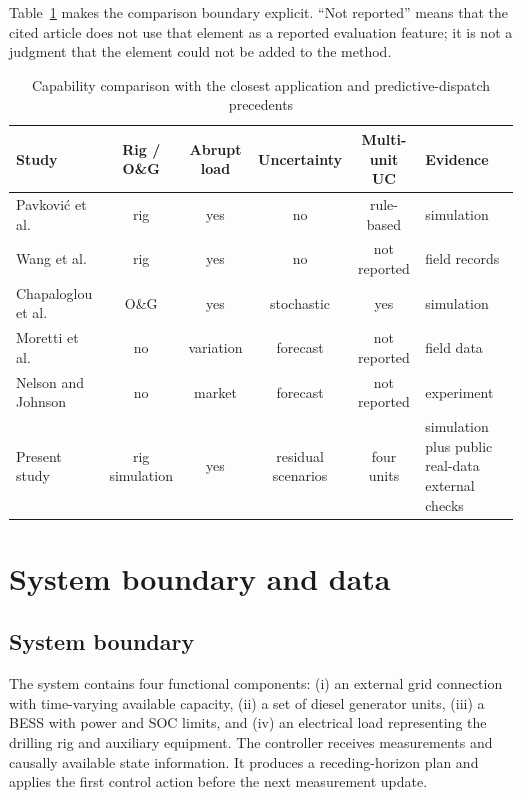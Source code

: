 Table~\ref{tab:closest-capabilities} makes the comparison boundary explicit.
``Not reported'' means that the cited article does not use that element as a
reported evaluation feature; it is not a judgment that the element could not be
added to the method.

\begin{table}[!t]
\caption{Capability comparison with the closest application and predictive-dispatch precedents}
\label{tab:closest-capabilities}
\centering
\scriptsize
\setlength{\tabcolsep}{3pt}
\begin{tabular}{@{}p{2.8cm}ccccp{2.1cm}@{}}
\toprule
Study & Rig / O\&G & Abrupt load & Uncertainty & Multi-unit UC & Evidence \\
\midrule
Pavkovi\'{c} et al. \citep{pavkovic2016oil} & rig & yes & no & rule-based & simulation \\
Wang et al. \citep{wang2025dualpower} & rig & yes & no & not reported & field records \\
Chapaloglou et al. \citep{chapaloglou2022datadriven} & O\&G & yes & stochastic & yes & simulation \\
Moretti et al. \citep{moretti2019twolayer} & no & variation & forecast & not reported & field data \\
Nelson and Johnson \citep{nelson2020realtime} & no & market & forecast & not reported & experiment \\
Present study & rig simulation & yes & residual scenarios & four units & simulation plus public real-data external checks \\
\bottomrule
\end{tabular}
\end{table}

\section{System boundary and data}\label{system-boundary-and-data}

\subsection{System boundary}\label{system-boundary}

The system contains four functional components: (i) an external grid
connection with time-varying available capacity, (ii) a set of diesel
generator units, (iii) a BESS with power and SOC limits, and (iv) an
electrical load representing the drilling rig and auxiliary equipment.
The controller receives measurements and causally available state
information. It produces a receding-horizon plan and applies the first
control action before the next measurement update.

